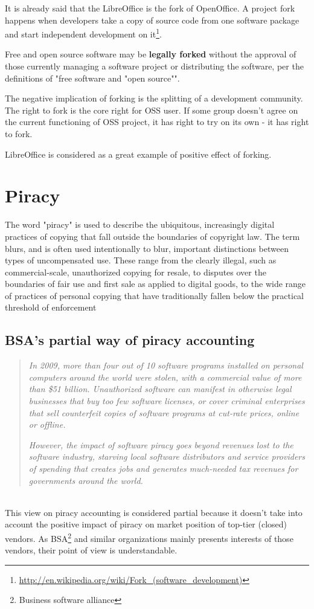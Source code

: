 \documentclass[times, utf8, seminar]{fit}
\begin{document}
It is already said that the LibreOffice is the fork of OpenOffice.  A project fork happens when developers take a copy of source code from one software package and start independent development on it\footnote{\url{http://en.wikipedia.org/wiki/Fork\_(software\_development)}}. 

Free and open source software may be \textbf{legally forked} without the approval of those currently managing a software project or distributing the software, per the definitions of "free software and "open source"".

The negative implication of forking is the splitting of a development community. The right to fork is the core right for OSS user. If some group doesn't agree on the current functioning of OSS project, it has right to try on its own - it has right to fork.

LibreOffice is considered as a great example of positive effect of forking.    

\section{Piracy}

The word "piracy" is used to describe the ubiquitous, increasingly digital practices of copying that fall outside the boundaries of copyright law. The term blurs, and is often used intentionally to blur, important distinctions between types of uncompensated use. These range from the clearly illegal, such as commercial-scale, unauthorized copying for resale, to disputes over the boundaries of fair use and first sale as applied to digital goods, to the wide range of practices of personal copying that have traditionally fallen below the practical threshold of enforcement\citep{mediapiracy}

\subsection{BSA's partial way of piracy accounting}

\begin{quotation}
\emph{In 2009, more than four out of 10 software programs installed on personal computers around the world were stolen, with a commercial value of more than \$51 billion. Unauthorized software can manifest in otherwise legal businesses that buy too few software licenses, or cover criminal enterprises that sell counterfeit copies of software programs at cut-rate prices, online or offline.}

\emph{However, the impact of software piracy goes beyond revenues lost to the software industry, starving local software distributors and service providers of spending that creates jobs and generates much-needed tax revenues for governments around the world.}\citep{bsapiracyimpact}
\end{quotation}\\
This view on piracy accounting is considered partial because it doesn't take into account the positive impact of piracy on market position of top-tier (closed) vendors. As BSA\footnote{Business software alliance} and similar organizations mainly presents interests of those vendors, their point of view is understandable.  
\end{document}
